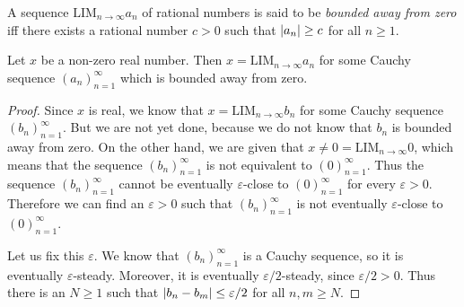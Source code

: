 \begin{definition}\label{5.3.12}
    A sequence \(\text{LIM}_{n \to \infty} a_n\) of rational numbers is said to be \emph{bounded away from zero} iff there exists a rational number \(c > 0\) such that \(\abs*{a_n} \geq c\) for all \(n \geq 1\).
\end{definition}

\setcounter{theorem}{13}
\begin{lemma}\label{5.3.14}
    Let \(x\) be a non-zero real number.
    Then \(x = \text{LIM}_{n \to \infty} a_n\) for some Cauchy sequence \((a_n)_{n = 1}^{\infty}\) which is bounded away from zero.
\end{lemma}

\begin{proof}
    Since \(x\) is real, we know that \(x = \text{LIM}_{n \to \infty} b_n\) for some Cauchy sequence \((b_n)_{n = 1}^{\infty}\).
    But we are not yet done, because we do not know that \(b_n\) is bounded away from zero.
    On the other hand, we are given that \(x \neq 0 = \text{LIM}_{n \to \infty} 0\), which means that the sequence \((b_n)_{n = 1}^{\infty}\) is not equivalent to \((0)_{n = 1}^{\infty}\).
    Thus the sequence \((b_n)_{n = 1}^{\infty}\) cannot be eventually \(\varepsilon\)-close to \((0)_{n = 1}^{\infty}\) for every \(\varepsilon > 0\).
    Therefore we can find an \(\varepsilon > 0\) such that \((b_n)_{n = 1}^{\infty}\) is not eventually \(\varepsilon\)-close to \((0)_{n = 1}^{\infty}\).

    Let us fix this \(\varepsilon\).
    We know that \((b_n)_{n = 1}^{\infty}\) is a Cauchy sequence, so it is eventually \(\varepsilon\)-steady.
    Moreover, it is eventually \(\varepsilon / 2\)-steady, since \(\varepsilon / 2 > 0\).
    Thus there is an \(N \geq 1\) such that \(\abs*{b_n - b_m} \leq \varepsilon / 2\) for all \(n, m \geq N\).


\end{proof}
